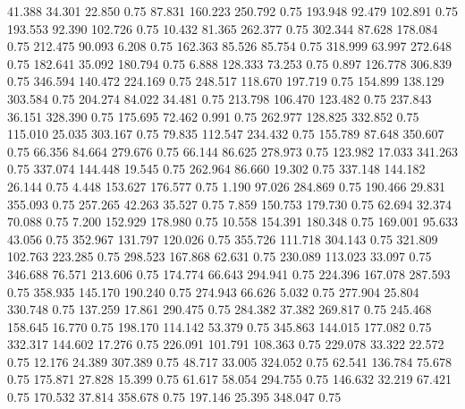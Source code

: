   41.388   34.301   22.850         0.75
  87.831  160.223  250.792         0.75
 193.948   92.479  102.891         0.75
 193.553   92.390  102.726         0.75
  10.432   81.365  262.377         0.75
 302.344   87.628  178.084         0.75
 212.475   90.093    6.208         0.75
 162.363   85.526   85.754         0.75
 318.999   63.997  272.648         0.75
 182.641   35.092  180.794         0.75
   6.888  128.333   73.253         0.75
   0.897  126.778  306.839         0.75
 346.594  140.472  224.169         0.75
 248.517  118.670  197.719         0.75
 154.899  138.129  303.584         0.75
 204.274   84.022   34.481         0.75
 213.798  106.470  123.482         0.75
 237.843   36.151  328.390         0.75
 175.695   72.462    0.991         0.75
 262.977  128.825  332.852         0.75
 115.010   25.035  303.167         0.75
  79.835  112.547  234.432         0.75
 155.789   87.648  350.607         0.75
  66.356   84.664  279.676         0.75
  66.144   86.625  278.973         0.75
 123.982   17.033  341.263         0.75
 337.074  144.448   19.545         0.75
 262.964   86.660   19.302         0.75
 337.148  144.182   26.144         0.75
   4.448  153.627  176.577         0.75
   1.190   97.026  284.869         0.75
 190.466   29.831  355.093         0.75
 257.265   42.263   35.527         0.75
   7.859  150.753  179.730         0.75
  62.694   32.374   70.088         0.75
   7.200  152.929  178.980         0.75
  10.558  154.391  180.348         0.75
 169.001   95.633   43.056         0.75
 352.967  131.797  120.026         0.75
 355.726  111.718  304.143         0.75
 321.809  102.763  223.285         0.75
 298.523  167.868   62.631         0.75
 230.089  113.023   33.097         0.75
 346.688   76.571  213.606         0.75
 174.774   66.643  294.941         0.75
 224.396  167.078  287.593         0.75
 358.935  145.170  190.240         0.75
 274.943   66.626    5.032         0.75
 277.904   25.804  330.748         0.75
 137.259   17.861  290.475         0.75
 284.382   37.382  269.817         0.75
 245.468  158.645   16.770         0.75
 198.170  114.142   53.379         0.75
 345.863  144.015  177.082         0.75
 332.317  144.602   17.276         0.75
 226.091  101.791  108.363         0.75
 229.078   33.322   22.572         0.75
  12.176   24.389  307.389         0.75
  48.717   33.005  324.052         0.75
  62.541  136.784   75.678         0.75
 175.871   27.828   15.399         0.75
  61.617   58.054  294.755         0.75
 146.632   32.219   67.421         0.75
 170.532   37.814  358.678         0.75
 197.146   25.395  348.047         0.75

